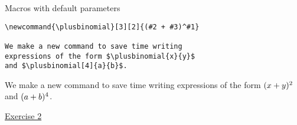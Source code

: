 \begin{frame}[fragile]{Macros with default parameters}
  \begin{lstlisting}
\newcommand{\plusbinomial}[3][2]{(#2 + #3)^#1}

We make a new command to save time writing
expressions of the form $\plusbinomial{x}{y}$
and $\plusbinomial[4]{a}{b}$.

  \end{lstlisting}
  We make a new command to save time writing expressions of the form
  $\plusbinomial{x}{y}$ and $\plusbinomial[4]{a}{b}$.
\end{frame}

\begin{frame}[standout]
  \href{https://jwalton.info/assets/teaching/latex/exercise_2.pdf}%
  {\color{white}Exercise 2}
\end{frame}

